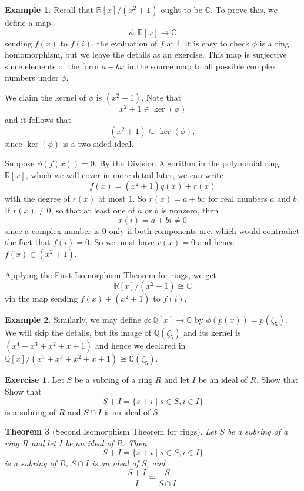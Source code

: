 \documentclass[12pt]{report}
\newtheorem{theorem}{Theorem}[chapter]
\numberwithin{equation}{section}
\numberwithin{theorem}{chapter}
\theoremstyle{definition}
\newtheorem{example}[theorem]{Example}
\newtheorem{exercise}{Exercise}
\newtheorem*{basic properties}{Basic Properties}
\newtheorem*{Important Remark}{Important Remark}
\newcommand{\R}{\mathbb{R}}
\newcommand{\Q}{\mathbb{Q}}
\newcommand{\C}{\mathbb{C}}
\renewcommand{\ker}{\operatorname{ker}}
\begin{document}
\begin{example}\label{qt by x^2+1}
Recall that $\R[x]/(x^2+1)$ ought to be $\C$. 
To prove this, we define a map
$$\phi\!: \R[x] \longrightarrow \C$$
sending $f(x)$ to $f(i)$, the evaluation of $f$ at $i$. It is easy to check $\phi$ is a ring homomorphism, but we leave the details as an exercise. 
This map is surjective since elements of the form $a + bx$ in the source map to all possible complex numbers under $\phi$.

We claim the kernel of $\phi$ is $(x^2 +1)$. Note that 
$$x^2 + 1 \in \ker(\phi)$$ 
and it follows that 
$$(x^2 + 1) \subseteq \ker(\phi),$$ 
since $\ker(\phi)$ is a two-sided ideal.

Suppose $\phi(f(x)) = 0$. By the Division Algorithm in the polynomial ring $\R[x]$, which we will cover in more detail later, we can write
$$f(x) = (x^2 + 1)q(x) + r(x)$$ 
with the degree of $r(x)$ at most $1$. 
So $r(x) = a + bx$ for real numbers $a$ and $b$. If $r(x) \neq 0$, so that at least one of $a$ or $b$ is nonzero, then
$$r(i) = a + bi \neq 0$$ 
since a complex number is $0$ only if both components are, which would contradict the fact that $f(i) = 0$. So we must have $r(x) = 0$ and hence $f(x) \in (x^2 +1)$.

Applying the \hyperref[First Isomorphism Theorem for rings]{First Isomorphism Theorem for rings}, we get
$$\R[x]/(x^2+1) \cong \C$$
via the map sending $f(x) + (x^2 + 1)$ to $f(i)$.
\end{example}

\begin{example} 
Similarly, we may define $\phi\!: \Q[x] \to \C$ by $\phi(p(x)) = p(\zeta_5)$. We will skip the details, but its image of $\Q(\zeta_5)$ and its kernel is $(x^4+x^3+x^2+x+1)$ and hence we declared in  $\Q[x]/(x^4+x^3+x^2+x+1) \cong \Q(\zeta_5)$.
\end{example}



\begin{exercise}\label{exercise 2nd iso rings}
	 Let $S$ be a subring of a ring $R$ and let $I$ be an ideal of $R$. Show that
	 Show that  
	 $$S + I = \{s + i \mid s \in S, i \in I\}$$ 
is a subring of $R$ and $S \cap I$ is an ideal of $S$.
\end{exercise}


\begin{theorem}[Second Isomorphism Theorem for rings]\label{Second Isomorphism Theorem for rings}
 Let $S$ be a subring  of a ring $R$ and let $I$ be an ideal of $R$. Then 
 $$S + I = \{s + i \mid s \in S, i \in I\}$$ 
 is a subring of $R$, $S \cap I$ is an ideal of $S$, and
 $$\frac{S+I}{I}\cong \frac{S}{S\cap I}.$$
\end{theorem}
\end{document}
